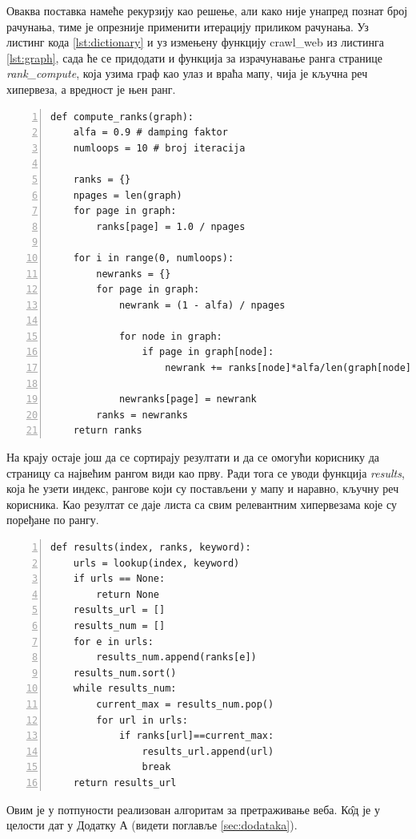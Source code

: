 Оваква поставка намеће рекурзију као решење, али како није унапред познат број рачунања, тиме је опрезније применити итерацију приликом рачунања. Уз листинг кода \ref{lst:dictionary} и уз измењену функцију crawl\_web из листинга \ref{lst:graph}, сада ће се придодати и функција за израчунавање ранга странице \emph{rank\_compute}, која узима граф као улаз и враћа мапу, чија је кључна реч хипервеза, а вредност је њен ранг.

\begin{lstlisting}[caption=Израчунавање ранга странице, label={lst:rank}, numbers=left]
def compute_ranks(graph):
    alfa = 0.9 # damping faktor
    numloops = 10 # broj iteracija

    ranks = {}
    npages = len(graph)
    for page in graph:
        ranks[page] = 1.0 / npages

    for i in range(0, numloops):
        newranks = {}
        for page in graph:
            newrank = (1 - alfa) / npages

            for node in graph:
                if page in graph[node]:
                    newrank += ranks[node]*alfa/len(graph[node])

            newranks[page] = newrank
        ranks = newranks
    return ranks
\end{lstlisting}

На крају остаје још да се сортирају резултати и да се омогући кориснику да страницу са највећим рангом види као прву. Ради тога се уводи функција \emph{results}, која ће узети индекс, рангове који су постављени у мапу и наравно, кључну реч корисника. Као резултат се даје листа са свим релевантним хипервезама које су поређане по рангу.

\begin{lstlisting}[caption=Функција која враћа најбољи резултат, label={lst:results}, numbers=left]
def results(index, ranks, keyword):
    urls = lookup(index, keyword)
    if urls == None:
        return None
    results_url = []
    results_num = []
    for e in urls:
        results_num.append(ranks[e])
    results_num.sort()
    while results_num:
        current_max = results_num.pop()
        for url in urls:
            if ranks[url]==current_max:
                results_url.append(url)
                break
    return results_url

\end{lstlisting}

Овим је у потпуности реализован алгоритам за претраживање веба. К\^{о}д је у целости дат у Додатку А (видети поглавље \ref{sec:dodataka}).
